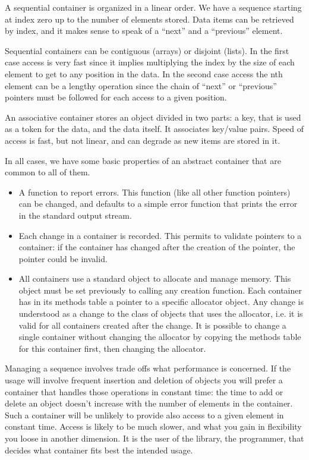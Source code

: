 \documentclass[12pt,a4paper]{memoir} %
\begin{document}
A sequential container is organized in a linear order. We have a sequence starting at index zero up to the number of elements stored. Data items can be retrieved by index, and it makes sense to speak of a “next” and a “previous” element.

Sequential containers can be contiguous (arrays) or disjoint (lists). In the first case access is very fast since it implies multiplying the index by the size of each element to get to any position in the data. In the second case access the nth element can be a lengthy operation since the chain of “next” or “previous” pointers must be followed for each access to a given position.

An associative container stores an object divided in two parts: a key, that is used as a token for the data, and the data itself. It associates key/value pairs. Speed of access is fast, but not linear, and can degrade as new items are stored in it.

In all cases, we have some basic properties of an abstract container that are common to all of them. 
\begin{itemize}
\item
A function to report errors. This function (like all other function pointers) can be changed, and defaults to a simple error function that prints the error in the standard output stream. 
\item
Each change in a container is recorded. This permits to validate pointers to a container: if the container has changed after the creation of the pointer, the pointer could be invalid.
\item
All containers use a standard object to allocate and manage memory. This object must be set previously to calling any creation function. Each container has in its methods table a pointer to a specific allocator object.   Any change is understood as a change to the class of objects that uses the allocator, i.e. it is valid for all containers created after the change. It is possible to change a single container without changing the allocator by copying the methods table for this container first, then changing the allocator.
\end{itemize}

Managing a sequence involves trade offs what performance is concerned. If the usage will involve frequent insertion and deletion of objects you will prefer a container that handles those operations in constant time: the time to add or delete an object doesn't increase with the number of elements in the container. Such a container will be unlikely to provide also access to a given element in constant time. Access is likely to be much slower, and what you gain in flexibility you loose in another dimension. It is the user of the library, the programmer, that decides what container fits best the intended usage.
\end{document}
